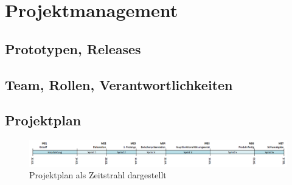 \chapter{Projektmanagement}
\label{pm-projektmanagement}

\section{Prototypen, Releases}


\section{Team, Rollen, Verantwortlichkeiten}



\section{Projektplan}
\begin{figure}[H]
	\centering
	\includegraphics[width=\textwidth]{images/projektmanagement/zeitstrahl.png}
	\caption{Projektplan als Zeitstrahl dargestellt}
	\label{image-project-plan-timeline}
\end{figure}



